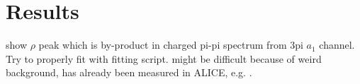 \section{Results}
\label{sec:Results}


show $\rho$ peak which is by-product in charged pi-pi spectrum from 3pi $a_1$ channel. Try to properly fit with fitting script. might be difficult because of weird background, has already been measured in ALICE, e.g. \cite{ALICErho}. \\